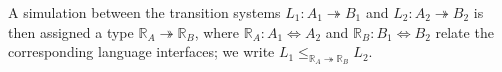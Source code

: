 A simulation between the transition systems
$L_1 : A_1 \twoheadrightarrow B_1$ and
$L_2 : A_2 \twoheadrightarrow B_2$
is then assigned a type $\mathbb{R}_A \twoheadrightarrow \mathbb{R}_B$,
where %
$\mathbb{R}_A : A_1 \Leftrightarrow A_2$ and
$\mathbb{R}_B : B_1 \Leftrightarrow B_2$
relate the corresponding language interfaces;
we write
$L_1 \le_{\mathbb{R}_A \twoheadrightarrow \mathbb{R}_B} L_2$.


